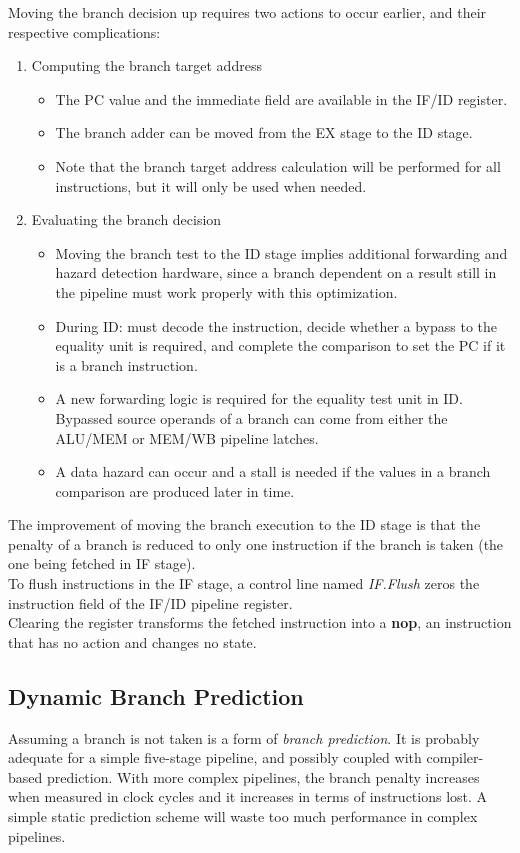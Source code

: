 \documentclass[12pt]{article}
\theoremstyle{definition}
\begin{document}
  Moving the branch decision up requires two actions to occur earlier, and their respective complications:
  \begin{enumerate}
    \item Computing the branch target address
    \begin{itemize}
      \item The PC value and the immediate field are available in the IF/ID register.
      \item The branch adder can be moved from the EX stage to the ID stage.
      \item Note that the branch target address calculation will be performed for all instructions, but it will only be used when needed.
    \end{itemize}
    \item Evaluating the branch decision
    \begin{itemize}
      \item Moving the branch test to the ID stage implies additional forwarding and hazard detection hardware, since a branch dependent on a result still in the pipeline must work properly with this optimization.
      \item During ID: must decode the instruction, decide whether a bypass to the equality unit is required, and complete the comparison to set the PC if it is a branch instruction.
      \item A new forwarding logic is required for the equality test unit in ID. \\
      Bypassed source operands of a branch can come from either the ALU/MEM or MEM/WB pipeline latches.
      \item A data hazard can occur and a stall is needed if the values in a branch comparison are produced later in time.
    \end{itemize}
  \end{enumerate}
  The improvement of moving the branch execution to the ID stage is that the penalty of a branch is reduced to only one instruction if the branch is taken (the one being fetched in IF stage). \\
  To flush instructions in the IF stage, a control line named \emph{IF.Flush} zeros the instruction field of the IF/ID pipeline register. \\
  Clearing the register transforms the fetched instruction into a \textbf{nop}, an instruction that has no action and changes no state.

  \subsection{Dynamic Branch Prediction}
  Assuming a branch is not taken is a form of \emph{branch prediction}.
  It is probably adequate for a simple five-stage pipeline, and possibly coupled with compiler-based prediction.
  With more complex pipelines, the branch penalty increases when measured in clock cycles and it increases in terms of instructions lost.
  A simple static prediction scheme will waste too much performance in complex pipelines. \\
\end{document}
